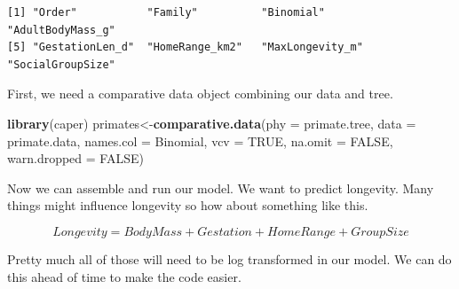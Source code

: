 \documentclass[
]{book}
\newenvironment{Shaded}{\begin{snugshade}}{\end{snugshade}}
\newcommand{\DataTypeTok}[1]{\textcolor[rgb]{0.13,0.29,0.53}{#1}}
\newcommand{\KeywordTok}[1]{\textcolor[rgb]{0.13,0.29,0.53}{\textbf{#1}}}
\newcommand{\NormalTok}[1]{#1}
\newcommand{\OperatorTok}[1]{\textcolor[rgb]{0.81,0.36,0.00}{\textbf{#1}}}
\newcommand{\OtherTok}[1]{\textcolor[rgb]{0.56,0.35,0.01}{#1}}
\newcommand{\StringTok}[1]{\textcolor[rgb]{0.31,0.60,0.02}{#1}}
\begin{document}
\begin{verbatim}
[1] "Order"           "Family"          "Binomial"        "AdultBodyMass_g"
[5] "GestationLen_d"  "HomeRange_km2"   "MaxLongevity_m"  "SocialGroupSize"
\end{verbatim}

First, we need a comparative data object combining our data and tree.

\begin{Shaded}
\begin{Highlighting}[]
\KeywordTok{library}\NormalTok{(caper)}
\NormalTok{primates\textless{}{-}}\KeywordTok{comparative.data}\NormalTok{(}\DataTypeTok{phy =}\NormalTok{ primate.tree, }\DataTypeTok{data =}\NormalTok{ primate.data, }
                           \DataTypeTok{names.col =}\NormalTok{ Binomial, }\DataTypeTok{vcv =} \OtherTok{TRUE}\NormalTok{, }
                           \DataTypeTok{na.omit =} \OtherTok{FALSE}\NormalTok{, }\DataTypeTok{warn.dropped =} \OtherTok{FALSE}\NormalTok{)}
\end{Highlighting}
\end{Shaded}

Now we can assemble and run our model. We want to predict longevity. Many things might influence longevity so how about something like this.

\[ Longevity = Body Mass + Gestation + Home Range + Group Size\]

Pretty much all of those will need to be log transformed in our model. We can do this ahead of time to make the code easier.

\begin{Shaded}
\end{Shaded}
\end{document}
